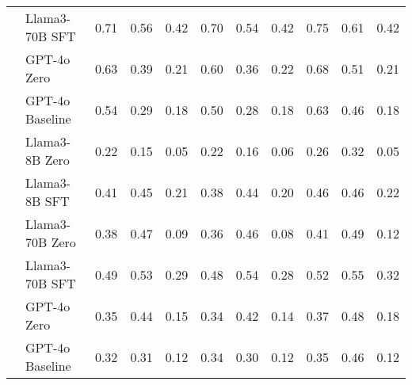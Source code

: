 \begin{longtable}[t]{l>{}l|rr>{}r|rr>{}r|rrr}
\nopagebreak
 & Llama3-70B SFT & 0.71 & 0.56 & 0.42 & 0.70 & 0.54 & 0.42 & 0.75 & 0.61 & 0.42\\
\nopagebreak
 & GPT-4o Zero & 0.63 & 0.39 & 0.21 & 0.60 & 0.36 & 0.22 & 0.68 & 0.51 & 0.21\\
\nopagebreak
 & GPT-4o Baseline & 0.54 & 0.29 & 0.18 & 0.50 & 0.28 & 0.18 & 0.63 & 0.46 & 0.18\\
\cmidrule{1-11}\pagebreak[0]
5 & Llama3-8B Zero & 0.22 & 0.15 & 0.05 & 0.22 & 0.16 & 0.06 & 0.26 & 0.32 & 0.05\\
\nopagebreak
 & Llama3-8B SFT & 0.41 & 0.45 & 0.21 & 0.38 & 0.44 & 0.20 & 0.46 & 0.46 & 0.22\\
\nopagebreak
 & Llama3-70B Zero & 0.38 & 0.47 & 0.09 & 0.36 & 0.46 & 0.08 & 0.41 & 0.49 & 0.12\\
\nopagebreak
 & Llama3-70B SFT & 0.49 & 0.53 & 0.29 & 0.48 & 0.54 & 0.28 & 0.52 & 0.55 & 0.32\\
\nopagebreak
 & GPT-4o Zero & 0.35 & 0.44 & 0.15 & 0.34 & 0.42 & 0.14 & 0.37 & 0.48 & 0.18\\
\nopagebreak
 & GPT-4o Baseline & 0.32 & 0.31 & 0.12 & 0.34 & 0.30 & 0.12 & 0.35 & 0.46 & 0.12\\*
\end{longtable}